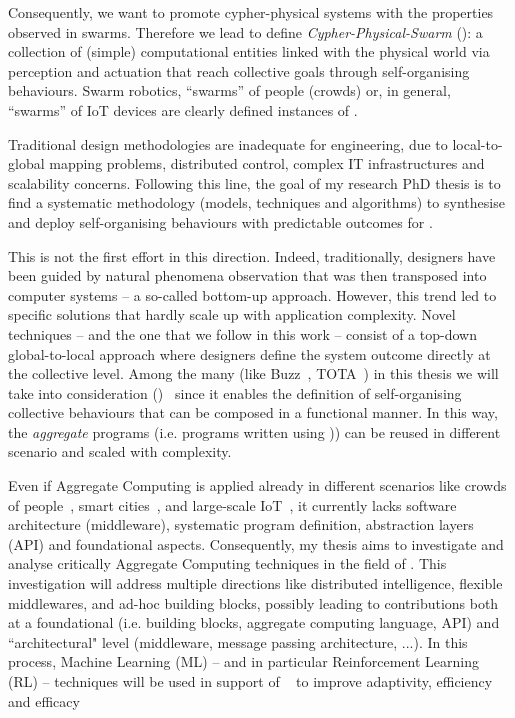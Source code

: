 \documentclass[11pt]{article}
\begin{document}
Consequently, we want to promote cypher-physical systems with the properties observed in swarms. 
%
Therefore we lead to define \textit{Cypher-Physical-Swarm} (\cpsw{}): a collection of (simple) computational entities linked with the physical world via perception and actuation that reach collective goals through self-organising behaviours.
%
Swarm robotics, ``swarms” of people (crowds) or, in general, ``swarms” of IoT devices are clearly defined instances of \cpsw{}.

Traditional design methodologies are inadequate for \cpsw{} engineering, due to local-to-global mapping problems, distributed control, complex IT infrastructures and scalability concerns.
%
Following this line, the goal of my research PhD thesis is to find a systematic methodology (models, techniques and algorithms) to synthesise and deploy self-organising behaviours with predictable outcomes for \cpsw{}.

This is not the first effort in this direction. Indeed, traditionally, designers have been guided
by natural phenomena observation that was then transposed into computer systems -- a so-called
bottom-up approach. However, this trend led to specific solutions that hardly scale up with application complexity.
%
Novel techniques -- and the one that we follow in this work -- consist of a top-down global-to-local approach where designers define the system outcome directly at the collective level.
%
Among the many (like Buzz~\cite{DBLP:journals/software/PinciroliB16}, TOTA~\cite{DBLP:conf/icdcsw/MameiZL03}) in this thesis we will take into consideration \textit{\acfull{}}(\ac{})~\cite{DBLP:journals/computer/BealPV15} since it enables the definition of self-organising collective behaviours that can be composed in a functional manner. In this way, the \textit{aggregate} programs (i.e. programs written using \ac{})) can be reused in different scenario and scaled with complexity. 

Even if Aggregate Computing is applied already in different scenarios like crowds of people~\cite{DBLP:journals/computer/BealPV15}, smart cities~\cite{DBLP:journals/isci/CasadeiFPRSV19}, and large-scale IoT~\cite{DBLP:journals/fgcs/CasadeiFPRSV19}, it currently lacks software architecture (middleware), systematic program definition, abstraction layers (API) and foundational aspects.
%
Consequently, my thesis aims to investigate and analyse critically Aggregate
Computing techniques in the field of \cpsw{}. 
%
This investigation will address multiple directions like distributed intelligence, flexible middlewares, and ad-hoc building blocks, possibly leading to contributions both at a foundational (i.e. building blocks, aggregate computing language, API) and ``architectural" level (middleware, message passing architecture, ...).
%
In this process, Machine Learning (ML) -- and in particular Reinforcement Learning (RL) -- techniques will be used in support of \acfull{}~\cite{research} to improve adaptivity, efficiency and efficacy
\end{document}
